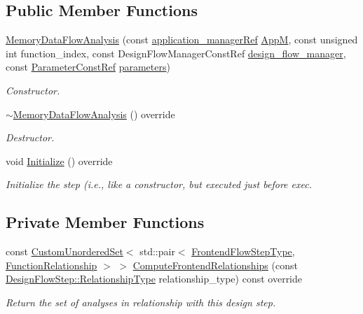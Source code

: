 \subsection*{Public Member Functions}
\begin{DoxyCompactItemize}
\item 
\hyperlink{classMemoryDataFlowAnalysis_a8be6f0e3914bb0d43066bebde0001466}{Memory\+Data\+Flow\+Analysis} (const \hyperlink{application__manager_8hpp_a04ccad4e5ee401e8934306672082c180}{application\+\_\+manager\+Ref} \hyperlink{classFrontendFlowStep_a0ac0d8db2a378416583f51c4faa59d15}{AppM}, const unsigned int function\+\_\+index, const Design\+Flow\+Manager\+Const\+Ref \hyperlink{classDesignFlowStep_ab770677ddf087613add30024e16a5554}{design\+\_\+flow\+\_\+manager}, const \hyperlink{Parameter_8hpp_a37841774a6fcb479b597fdf8955eb4ea}{Parameter\+Const\+Ref} \hyperlink{classDesignFlowStep_a802eaafe8013df706370679d1a436949}{parameters})
\begin{DoxyCompactList}\small\item\em Constructor. \end{DoxyCompactList}\item 
\hyperlink{classMemoryDataFlowAnalysis_abed28970b39608c42f92a586d57177fb}{$\sim$\+Memory\+Data\+Flow\+Analysis} () override
\begin{DoxyCompactList}\small\item\em Destructor. \end{DoxyCompactList}\item 
void \hyperlink{classMemoryDataFlowAnalysis_a7c26b870182fa981eab5056955fd89d9}{Initialize} () override
\begin{DoxyCompactList}\small\item\em Initialize the step (i.\+e., like a constructor, but executed just before exec. \end{DoxyCompactList}\end{DoxyCompactItemize}
\subsection*{Private Member Functions}
\begin{DoxyCompactItemize}
\item 
const \hyperlink{classCustomUnorderedSet}{Custom\+Unordered\+Set}$<$ std\+::pair$<$ \hyperlink{frontend__flow__step_8hpp_afeb3716c693d2b2e4ed3e6d04c3b63bb}{Frontend\+Flow\+Step\+Type}, \hyperlink{classFrontendFlowStep_af7cf30f2023e5b99e637dc2058289ab0}{Function\+Relationship} $>$ $>$ \hyperlink{classMemoryDataFlowAnalysis_a421b53a83bfda726cfadd87f0232bb0d}{Compute\+Frontend\+Relationships} (const \hyperlink{classDesignFlowStep_a723a3baf19ff2ceb77bc13e099d0b1b7}{Design\+Flow\+Step\+::\+Relationship\+Type} relationship\+\_\+type) const override
\begin{DoxyCompactList}\small\item\em Return the set of analyses in relationship with this design step. \end{DoxyCompactList}\end{DoxyCompactItemize}
